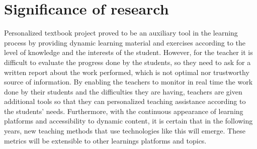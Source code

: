 \section{Significance of research}
Personalized textbook project \cite{Mircea2018} proved to be an auxiliary tool in the learning process by providing dynamic learning material and exercises according to the level of knowledge and the interests of the student. However, for the teacher it is difficult to evaluate the progress done by the students, so they need to ask for a written report about the work performed, which is not optimal nor trustworthy source of information. 
By enabling the teachers to monitor in real time the work done by their students and the difficulties they are having, teachers are given additional tools so that they can personalized teaching assistance according to the students’ needs.
Furthermore, with the continuous appearance of learning platforms and accessibility to dynamic content, it is certain that in the following years, new teaching methods that use technologies like this will emerge.
These metrics will be extensible to other learnings platforms and topics.


